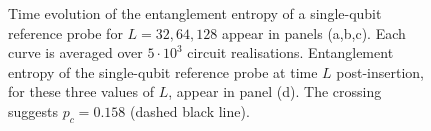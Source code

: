\documentclass[10pt]{article}
\begin{document}
\begin{figure}
\centering
{}
\caption{Time evolution of the entanglement entropy of a single-qubit reference probe for $L=32,64,128$ appear in panels (a,b,c). Each curve is averaged over $5\cdot10^3$ circuit realisations. Entanglement entropy of the single-qubit reference probe at time $L$ post-insertion, for these three values of $L$, appear in panel (d). The crossing suggests $p_c=0.158$ (dashed black line).}
\label{fig_probe1pt}
\end{figure}


\end{document}

